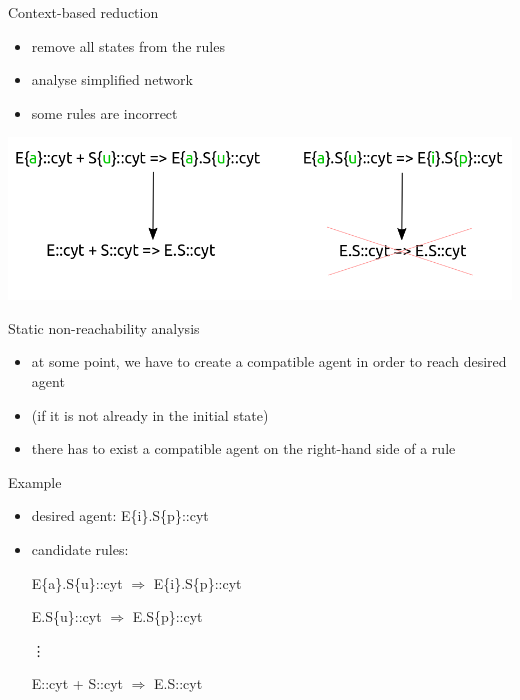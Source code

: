 \documentclass[10pt]{beamer}
\newcommand{\backupend}{
   \addtocounter{framenumberappendix}{-\value{framenumber}}
   \addtocounter{framenumber}{\value{framenumberappendix}} 
}
\begin{document}
\begin{frame}[fragile]{Context-based reduction}

\begin{itemize}
	\item remove all states from the rules
	\item analyse simplified network 
	\item some rules are incorrect
\end{itemize}

  \begin{center}
    \includegraphics[width=\textwidth]{pics/reduction_example}
  \end{center}

\end{frame}


\begin{frame}[fragile]{Static non-reachability analysis}

\begin{itemize}
	\item at some point, we have to create a compatible agent in order to reach desired agent
	\item (if it is not already in the initial state)
	\item there has to exist a compatible agent on the right-hand side of a rule
\end{itemize}

Example

\begin{itemize}
	\item desired agent: E\{\textcolor{mygreen}{i}\}.S\{\textcolor{mygreen}{p}\}::cyt

	\item candidate rules: 
	
	E\{\textcolor{mygreen}{a}\}.S\{\textcolor{mygreen}{u}\}::cyt $\Rightarrow$ E\{\textcolor{mygreen}{i}\}.S\{\textcolor{mygreen}{p}\}::cyt

	E.S\{\textcolor{mygreen}{u}\}::cyt $\Rightarrow$ E.S\{\textcolor{mygreen}{p}\}::cyt

	\hspace*{2cm}\vdots

	E::cyt + S::cyt $\Rightarrow$ E.S::cyt

\end{itemize}

\end{frame}

\backupend

\end{document}
